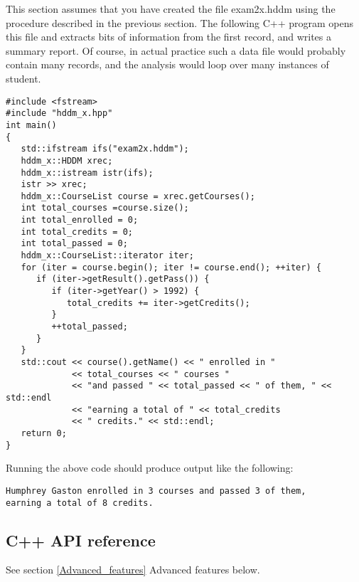 \documentclass{revtex4}
\begin{document}
This section assumes that you have created the file exam2x.hddm using the
procedure described in the previous section. The following C++ program 
opens this file and extracts bits of information from the first record,
and writes a summary report. Of course, in actual practice such a data
file would probably contain many records, and the analysis would loop
over many instances of student.

\vspace{0.5cm}
\begin{minipage}{12cm}
\begin{verbatim}
#include <fstream>
#include "hddm_x.hpp"
int main()
{
   std::ifstream ifs("exam2x.hddm");
   hddm_x::HDDM xrec;
   hddm_x::istream istr(ifs);
   istr >> xrec;
   hddm_x::CourseList course = xrec.getCourses();
   int total_courses =course.size();
   int total_enrolled = 0;
   int total_credits = 0;
   int total_passed = 0;
   hddm_x::CourseList::iterator iter;
   for (iter = course.begin(); iter != course.end(); ++iter) {
      if (iter->getResult().getPass()) {
         if (iter->getYear() > 1992) {
            total_credits += iter->getCredits();
         }
         ++total_passed;
      }
   }
   std::cout << course().getName() << " enrolled in "
             << total_courses << " courses "
             << "and passed " << total_passed << " of them, " << std::endl
             << "earning a total of " << total_credits
             << " credits." << std::endl;
   return 0;
}
\end{verbatim}
\end{minipage}
\vspace{0.5cm}

Running the above code should produce output like the following:

\vspace{0.5cm}
\begin{minipage}{12cm}
\begin{verbatim}
Humphrey Gaston enrolled in 3 courses and passed 3 of them,
earning a total of 8 credits.
\end{verbatim}
\end{minipage}
\vspace{0.5cm}

\subsection{C++ API reference}

See section \ref{Advanced_features} {Advanced features} below.
\end{document}
